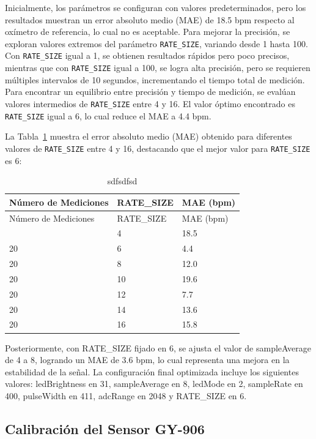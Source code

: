 \documentclass[
  letterpaper,
  DIV=11,
  numbers=noendperiod]{scrreport}
\begin{document}
Inicialmente, los parámetros se configuran con valores predeterminados,
pero los resultados muestran un error absoluto medio (MAE) de 18.5 bpm
respecto al oxímetro de referencia, lo cual no es aceptable. Para
mejorar la precisión, se exploran valores extremos del parámetro
\texttt{RATE\_SIZE}, variando desde 1 hasta 100. Con \texttt{RATE\_SIZE}
igual a 1, se obtienen resultados rápidos pero poco precisos, mientras
que con \texttt{RATE\_SIZE} igual a 100, se logra alta precisión, pero
se requieren múltiples intervalos de 10 segundos, incrementando el
tiempo total de medición. Para encontrar un equilibrio entre precisión y
tiempo de medición, se evalúan valores intermedios de
\texttt{RATE\_SIZE} entre 4 y 16. El valor óptimo encontrado es
\texttt{RATE\_SIZE} igual a 6, lo cual reduce el MAE a 4.4 bpm.

La Tabla~\ref{tbl-max30102} muestra el error absoluto medio (MAE)
obtenido para diferentes valores de \texttt{RATE\_SIZE} entre 4 y 16,
destacando que el mejor valor para \texttt{RATE\_SIZE} es 6:

\hypertarget{tbl-max30102}{}
\begin{longtable}[]{@{}lll@{}}
\caption{\label{tbl-max30102}sdfsdfsd}\tabularnewline
\toprule\noalign{}
Número de Mediciones & RATE\_SIZE & MAE (bpm) \\
\midrule\noalign{}
\endfirsthead
\toprule\noalign{}
Número de Mediciones & RATE\_SIZE & MAE (bpm) \\
\midrule\noalign{}
\endhead
\bottomrule\noalign{}
\endlastfoot
20 & 4 & 18.5 \\
20 & 6 & 4.4 \\
20 & 8 & 12.0 \\
20 & 10 & 19.6 \\
20 & 12 & 7.7 \\
20 & 14 & 13.6 \\
20 & 16 & 15.8 \\
\end{longtable}

Posteriormente, con RATE\_SIZE fijado en 6, se ajusta el valor de
sampleAverage de 4 a 8, logrando un MAE de 3.6 bpm, lo cual representa
una mejora en la estabilidad de la señal. La configuración final
optimizada incluye los siguientes valores: ledBrightness en 31,
sampleAverage en 8, ledMode en 2, sampleRate en 400, pulseWidth en 411,
adcRange en 2048 y RATE\_SIZE en 6.

\hypertarget{calibraciuxf3n-del-sensor-gy-906}{%
\subsection{Calibración del Sensor
GY-906}\label{calibraciuxf3n-del-sensor-gy-906}}
\end{document}
